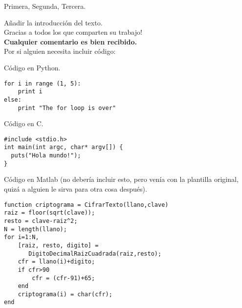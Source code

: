 \begin{multicols}{2}



 Primera, Segunda, Tercera.



A\~nadir la introducci\'on del texto. \\
Gracias a todos los que comparten su trabajo!\\
\textbf{Cualquier comentario es bien recibido.}\\
Por si alguien necesita incluir c\'odigo:


C\'odigo en Python.
\begin{verbatim}
for i in range (1, 5):
    print i
else:
    print "The for loop is over"
\end{verbatim}

C\'odigo en  C.

\begin{lstlisting}[style=C]
#include <stdio.h>
int main(int argc, char* argv[]) {
  puts("Hola mundo!");
}
\end{lstlisting}

\vspace{2mm}
 
C\'odigo en Matlab (no deber\'ia incluir esto, pero ven\'ia con la plantilla original, quiz\'a a alguien le sirva para otra cosa despu\'es).\\
\lstset{language=Matlab,frame=tb,framesep=5pt,basicstyle=\scriptsize}   
\begin{lstlisting}
function criptograma = CifrarTexto(llano,clave)
raiz = floor(sqrt(clave));
resto = clave-raiz^2;
N = length(llano);
for i=1:N,
    [raiz, resto, digito] = 
       DigitoDecimalRaizCuadrada(raiz,resto);
    cfr = llano(i)+digito;
    if cfr>90
        cfr = (cfr-91)+65;
    end
    criptograma(i) = char(cfr);
end
\end{lstlisting} 
 
\noindent


\end{multicols}
